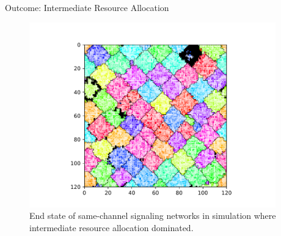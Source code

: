 \begin{frame}{Outcome: Intermediate Resource Allocation}
\begin{figure}
\begin{columns}
\begin{column}{0.6\textwidth}
\includegraphics[width=\textwidth,trim={2.5cm 0 2.5cm 0},clip]{img/results/ChannelMap_1046_update24995104}
\end{column}
\begin{column}{0.4\textwidth}
\caption{
End state of same-channel signaling networks in simulation where intermediate resource allocation dominated.
}
\end{column}
\end{columns}
\end{figure}
\end{frame}

